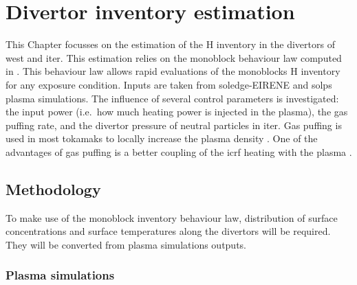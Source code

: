 \setchapterpreamble[u]{\margintoc}
\chapter{Divertor inventory estimation}\label{Chapter4}


This Chapter focusses on the estimation of the \gls{H} \gls{inventory} in the \glspl{divertor} of \acrshort{west} and \gls{iter}.
This estimation relies on the \gls{monoblock} behaviour law computed in .
This behaviour law allows rapid evaluations of the \glspl{monoblock} \gls{H} \gls{inventory} for any exposure condition.
Inputs are taken from \gls{soledge}-EIRENE \cite{bufferand_three-dimensional_2019} and \gls{solps} \cite{kaveeva_solps-iter_2020} plasma simulations.
The influence of several control parameters is investigated: the input power (i.e.\ how much heating power is injected in the plasma), the gas puffing rate, and the \gls{divertor} pressure of neutral particles in \gls{iter}.
Gas puffing is used in most \glspl{tokamak} to locally increase the \gls{plasma} density \cite{zweben_effect_2014}.
One of the advantages of gas puffing is a better coupling of the \gls{icrf} heating with the plasma \cite{zhang_scrape-off_2019}.

\section{Methodology}
To make use of the \gls{monoblock} \gls{inventory} behaviour law, distribution of surface concentrations and surface temperatures along the \glspl{divertor} will be required.
They will be converted from plasma simulations outputs.

\subsection{Plasma simulations}

